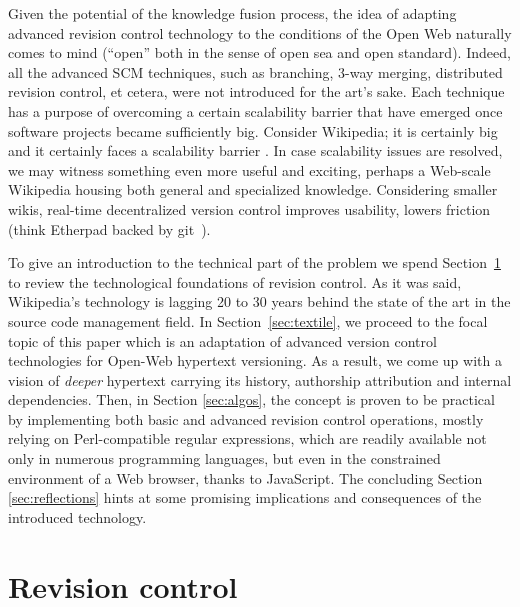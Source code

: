 \documentclass{acm_proc_article-sp}
\begin{document}
Given the potential of the knowledge fusion process, the idea
of adapting advanced revision control technology to the conditions
of the Open Web naturally comes to mind (``open'' both in the
sense of open sea and open standard). 
Indeed, all the advanced SCM techniques, such as branching,
3-way merging, distributed revision control, et cetera, were not
introduced for the art's sake. Each technique has a purpose of
overcoming a certain scalability barrier that have emerged once
software projects became sufficiently big. 
Consider Wikipedia; it is certainly big and it certainly faces
a scalability barrier \cite{no-singularity, wp-decay}. In case
scalability issues are resolved, we
may witness something even more useful and exciting, perhaps 
a Web-scale Wikipedia housing both general and specialized
knowledge. Considering smaller wikis, real-time decentralized
version control improves usability, lowers friction (think
Etherpad backed by git~\cite{git}).

To give an introduction to the technical part of the problem we spend
Section~\ref{sec:scm} to
review the technological foundations of
revision control. As it was said, Wikipedia's technology 
is lagging 20 to 30 years behind the state of the art in the
source code management field. 
In Section~\ref{sec:textile}, we proceed to the focal topic of
this paper which is an
adaptation of advanced version control technologies for Open-Web
hypertext versioning. As a result, we come up with a vision of
\emph{deeper} hypertext carrying its history, authorship
attribution and internal dependencies.
Then, in Section \ref{sec:algos}, the concept is proven to be
practical by implementing both
basic and advanced revision control operations, mostly relying
on Perl-compatible regular expressions, which are readily available not
only in numerous programming languages, but even in the
constrained environment of a Web browser, thanks to JavaScript.
The concluding Section \ref{sec:reflections} hints at some promising
implications and consequences of the introduced technology.




\section{Revision control} \label{sec:scm}
\end{document}
